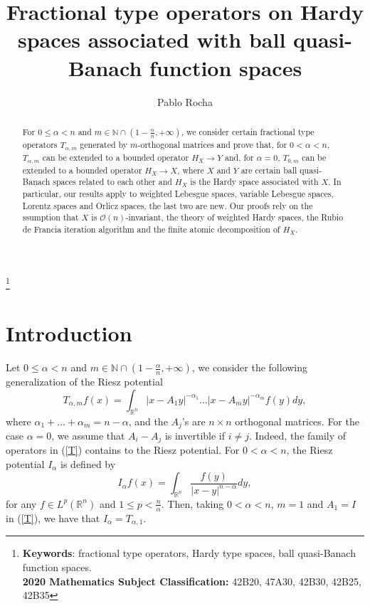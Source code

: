 \documentclass[oneside,10pt]{article}
\newcommand\blfootnote[1]{%
  \begingroup
  \renewcommand\thefootnote{}\footnote{#1}%
  \addtocounter{footnote}{-1}%
  \endgroup}
\begin{document}
\title{Fractional type operators on Hardy spaces associated with ball quasi-Banach function spaces}
\author{Pablo Rocha}

\maketitle

\begin{abstract}
For $0 \leq \alpha < n$ and $m \in \mathbb{N} \cap \left(1 - \frac{\alpha}{n}, +\infty \right)$, we consider certain fractional type 
operators $T_{\alpha, m}$ generated by $m$-orthogonal matrices and prove that, for $0 < \alpha < n$, $T_{\alpha, m}$ can be extended to a bounded operator $H_X \to Y$ and, for $\alpha = 0$, $T_{0, m}$ can be extended to a bounded operator $H_X \to X$, where $X$ and $Y$ are certain ball quasi-Banach spaces related to each other and $H_X$ is the Hardy space associated with $X$. In particular, our results apply to weighted Lebesgue spaces, variable Lebesgue spaces, Lorentz spaces and Orlicz spaces, the last two are new. Our proofs rely on the ssumption that $X$ is $\mathcal{O}(n)$-invariant, the theory of weighted Hardy spaces, the Rubio de Francia iteration algorithm and the finite atomic decomposition of $H_X$.
\end{abstract}

\blfootnote{{\bf Keywords}: fractional type operators, Hardy type spaces, ball quasi-Banach function spaces. \\
{\bf 2020 Mathematics Subject Classification:} 42B20, 47A30, 42B30, 42B25, 42B35}

\section{Introduction}

Let $0\leq \alpha <n$ and $m \in \mathbb{N} \cap \left(1 - \frac{\alpha}{n}, +\infty \right)$, we consider the following generalization of the Riesz potential
\begin{equation}
T_{\alpha, m}f(x)=\int_{\mathbb{R}^{n}} \left\vert x-A_{1}y\right\vert ^{-\alpha
_{1}}...\left\vert x-A_{m}y\right\vert ^{-\alpha _{m}}f(y)dy,  \label{T}
\end{equation}
where $\alpha _{1}+...+\alpha _{m}=n-\alpha$, and the $A_j$'s are $n \times n$ orthogonal matrices. For the case $\alpha = 0$, we assume that 
$A_i - A_j$ is invertible if $i \neq j$. Indeed, the family of operators in (\ref{T}) contains to the Riesz potential. For $0 < \alpha < n$, the Riesz potential $I_{\alpha}$ is defined by
\begin{equation} \label{Riesz pot}
I_{\alpha}f(x) = \int_{\mathbb{R}^{n}} \frac{f(y)}{|x-y|^{n- \alpha}} dy, 
\end{equation}
for any $f \in L^{p}(\mathbb{R}^{n})$ and $1 \leq p < \frac{n}{\alpha}$. Then, taking $0 < \alpha < n$, $m=1$ and $A_1 = I$ in (\ref{T}), we have that $I_\alpha = T_{\alpha, 1}$. 
\end{document}
